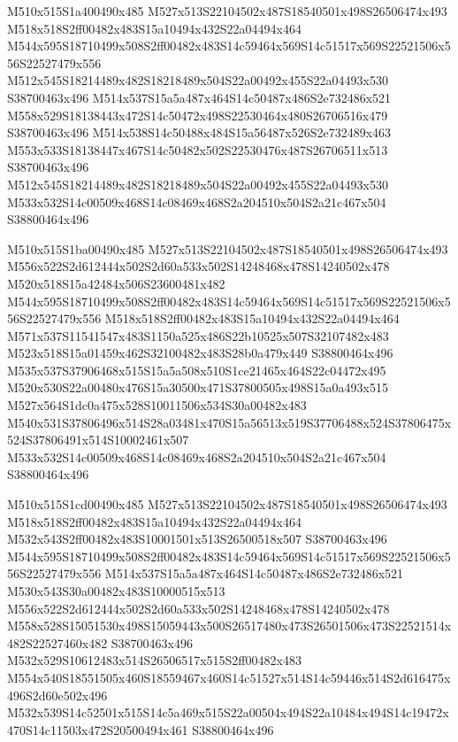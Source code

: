 \documentclass{article}
\begin{document}
\begin{multicols}{2}
M510x515S1a400490x485 M527x513S22104502x487S18540501x498S26506474x493 M518x518S2ff00482x483S15a10494x432S22a04494x464 M544x595S18710499x508S2ff00482x483S14c59464x569S14c51517x569S22521506x556S22527479x556 M512x545S18214489x482S18218489x504S22a00492x455S22a04493x530 S38700463x496 M514x537S15a5a487x464S14c50487x486S2e732486x521 M558x529S18138443x472S14c50472x498S22530464x480S26706516x479 S38700463x496 M514x538S14c50488x484S15a56487x526S2e732489x463 M553x533S18138447x467S14c50482x502S22530476x487S26706511x513 S38700463x496 M512x545S18214489x482S18218489x504S22a00492x455S22a04493x530 M533x532S14c00509x468S14c08469x468S2a204510x504S2a21c467x504 S38800464x496

M510x515S1ba00490x485 M527x513S22104502x487S18540501x498S26506474x493 M556x522S2d612444x502S2d60a533x502S14248468x478S14240502x478 M520x518S15a42484x506S23600481x482 M544x595S18710499x508S2ff00482x483S14c59464x569S14c51517x569S22521506x556S22527479x556 M518x518S2ff00482x483S15a10494x432S22a04494x464 M571x537S11541547x483S1150a525x486S22b10525x507S32107482x483 M523x518S15a01459x462S32100482x483S28b0a479x449 S38800464x496 M535x537S37906468x515S15a5a508x510S1ce21465x464S22c04472x495 M520x530S22a00480x476S15a30500x471S37800505x498S15a0a493x515 M527x564S1dc0a475x528S10011506x534S30a00482x483 M540x531S37806496x514S28a03481x470S15a56513x519S37706488x524S37806475x524S37806491x514S10002461x507 M533x532S14c00509x468S14c08469x468S2a204510x504S2a21c467x504 S38800464x496

M510x515S1cd00490x485 M527x513S22104502x487S18540501x498S26506474x493 M518x518S2ff00482x483S15a10494x432S22a04494x464 M532x543S2ff00482x483S10001501x513S26500518x507 S38700463x496 M544x595S18710499x508S2ff00482x483S14c59464x569S14c51517x569S22521506x556S22527479x556 M514x537S15a5a487x464S14c50487x486S2e732486x521 M530x543S30a00482x483S10000515x513 M556x522S2d612444x502S2d60a533x502S14248468x478S14240502x478 M558x528S15051530x498S15059443x500S26517480x473S26501506x473S22521514x482S22527460x482 S38700463x496 M532x529S10612483x514S26506517x515S2ff00482x483 M554x540S18551505x460S18559467x460S14c51527x514S14c59446x514S2d616475x496S2d60e502x496 M532x539S14c52501x515S14c5a469x515S22a00504x494S22a10484x494S14c19472x470S14c11503x472S20500494x461 S38800464x496


\end{multicols}
\end{document}
